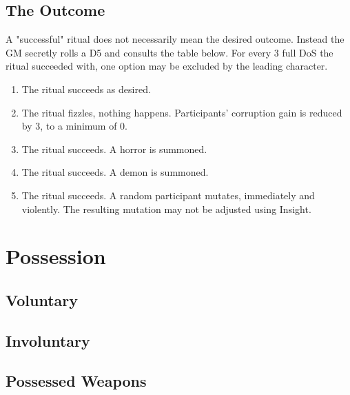 \documentclass[12pt,a4paper,openany]{book}
\begin{document}
	\section{The Outcome}
	A "successful" ritual does not necessarily mean the desired outcome. Instead the GM secretly rolls a D5 and consults the table below. For every 3 full DoS the ritual succeeded with, one option may be excluded by the leading character.
	\par
	\begin{enumerate}
		\raggedright
		\setlength\itemsep{-8mm}
		\item The ritual succeeds as desired.
		\item The ritual fizzles, nothing happens. Participants' corruption gain is reduced by 3, to a minimum of 0.
		\item The ritual succeeds. A horror is summoned.
		\item The ritual succeeds. A demon is summoned.
		\item The ritual succeeds. A random participant mutates, immediately and violently. The resulting mutation may not be adjusted using Insight.
	\end{enumerate}
%	
	
	\chapter{Possession}
	\section{Voluntary}
	\section{Involuntary}
	
	\section{Possessed Weapons}
	
\end{document}
